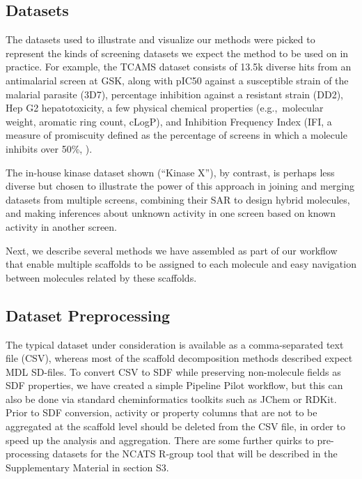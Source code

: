 \documentclass[journal=jacsat,manuscript=article]{achemso}
\newcommand*\tref[1]{Table~\ref{table:#1}}
\newcommand*\eg{e.g.,~}
\begin{document}
\subsection{Datasets}
\label{sec:datasets}
The datasets used to illustrate and visualize our methods were picked
to represent the kinds of screening datasets we expect the method to
be used on in practice. For example, the TCAMS dataset\cite{Gamo2010}
consists of 13.5k diverse hits from an antimalarial screen at GSK,
along with pIC50 against a susceptible strain of the malarial parasite
(3D7), percentage inhibition against a resistant strain (DD2), Hep G2
hepatotoxicity, a few physical chemical properties (\eg molecular
weight, aromatic ring count, cLogP), and Inhibition Frequency Index
(IFI, a measure of promiscuity defined as the percentage of screens in
which a molecule inhibits over 50\%, \cite{Chakravorty2013IFI}).

The in-house kinase dataset shown (``Kinase X''), by contrast, is perhaps less
diverse but chosen to illustrate the power of this approach in joining
and merging datasets from multiple screens, combining their SAR to
design hybrid molecules, and making inferences about unknown activity
in one screen based on known activity in another screen.


Next, we describe several methods we have assembled as part of our
workflow that enable multiple scaffolds to be assigned to each
molecule and easy navigation between molecules related by these
scaffolds.


\subsection{Dataset Preprocessing}
\label{sec:prepro}
The typical dataset under consideration is available as a
comma-separated text file (CSV), whereas most of the scaffold
decomposition methods described expect MDL SD-files. To convert CSV to
SDF while preserving non-molecule fields as SDF properties, we have
created a simple Pipeline Pilot workflow, but this can also be done
via standard cheminformatics toolkits such as JChem or RDKit. Prior to
SDF conversion, activity or property columns that are not to be
aggregated at the scaffold level should be deleted from the CSV file,
in order to speed up the analysis and aggregation.  There are some
further quirks to pre-processing datasets for the NCATS R-group tool
that will be described in the Supplementary Material in section S3.
\end{document}
